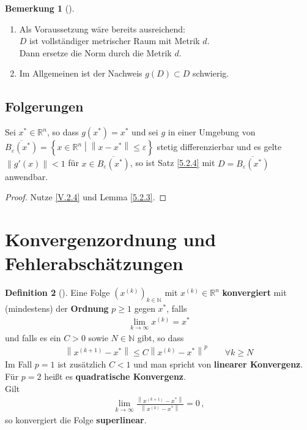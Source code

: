 \documentclass[ngerman,fontsize=11pt, paper=a4, parskip=half, titlepage=true, toc=bib]{scrbook}
\theoremstyle{definition}
\newtheorem{Def}{Definition}[section]		%
\newtheorem{Bem}[Def]{Bemerkung}	%
\theoremstyle{plain}
\newcommand{\R}{\mathds{R}}
\newcommand{\N}{\mathds{N}}
\newcommand{\nn}[1]{\left\| #1 \right\|}
\newcommand{\sectione}[1]{\section{#1} \setcounter{equation}{0}}
\newcommand{\subsectione}[1]{\subsection{#1} \addtocounter{Def}{1}}
\newenvironment{Beme}[1][]{ %
	\begin{Bem}[#1]
	}
	{
	\end{Bem}
	\addtocounter{subsection}{1}
}
\newenvironment{Defe}[1][]{ %
	\begin{Def}[#1]
	}
	{
	\end{Def}
	\addtocounter{subsection}{1}
}
\begin{document}
\begin{Beme}
	\label{5.2.5}~
	\begin{enumerate}[1)]
		\item Als Voraussetzung wäre bereits ausreichend:\\
		$D$ ist vollständiger metrischer Raum mit Metrik $d$. \\
		Dann ersetze die Norm durch die Metrik $d$.
		\item Im Allgemeinen ist der Nachweis $g(D)\subset D$ schwierig.
	\end{enumerate}
\end{Beme}
  
  
  
  \subsectione{Folgerungen}\label{5.2.6}
  Sei $x^{*}\in \R^n$, so dass $g(x^{*})=x^{*}$ und sei $g$ in einer Umgebung von 
  $\overline{B_\varepsilon(x^{*})}=\left\{ x\in \R^n \middle\vert \nn{x-x^{*}}\leq \varepsilon \right\}$ stetig differenzierbar und es gelte $\nn{g'(x)}<1$ für $x\in \overline{B_\varepsilon(x^{*})}$,
  so ist Satz \ref{5.2.4} mit $D=\overline{B_\varepsilon(x^{*})}$ anwendbar.
  
  \begin{proof}
    Nutze \eqref{V.2.4} und Lemma \ref{5.2.3}.
  \end{proof}
  
  \sectione{Konvergenzordnung und Fehlerabschätzungen}
  
  \begin{Defe}
  	\label{5.3.1}
  	Eine Folge $(x^{(k)})_{k\in\N} $ mit $x^{(k)}\in\R^n$ \textbf{konvergiert} mit (mindestens)
  	der \textbf{Ordnung} $p\geq 1$ gegen $x^{*}$, falls
  	\begin{gather*}
  	\lim\limits_{k\rightarrow \infty}x^{(k)}=x^{*}
  	\end{gather*}
  	und falls es ein $C>0$ sowie $N\in\N$ gibt, so dass
  	\begin{gather*}
  	\nn{x^{(k+1)}-x^{*}} \leq C \nn{x^{(k)}-x^{*}}^p\qquad \forall k\geq N 
  	\end{gather*}
  	Im Fall $p=1$ ist zusätzlich $C<1$ und man spricht von \textbf{linearer Konvergenz}. \\
  	Für $p=2$ heißt es \textbf{quadratische Konvergenz}.
  	\\Gilt 
  	\begin{gather*} 
  	\lim\limits_{k\rightarrow \infty}\frac{\nn{x^{(k+1)}-x^{*}}}{\nn{x^{(k)}-x^{*}}} = 0\, ,
  	\end{gather*} so konvergiert die Folge \textbf{superlinear}.
  \end{Defe}
\end{document}
